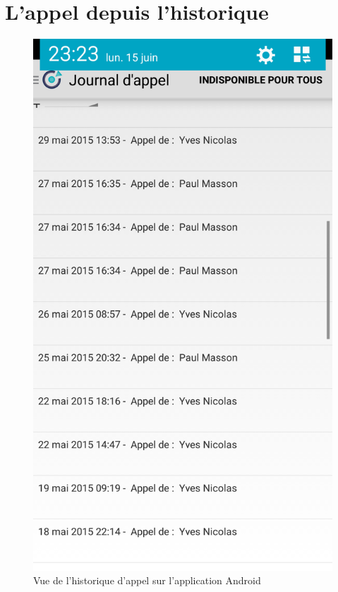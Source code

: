 \section{L'appel depuis l'historique}

\begin{figure}[!h]
	\centering
	\includegraphics[scale=0.1]{img/historique.png}
	\caption{\label{historique} {Vue de l'historique d'appel sur l'application Android}}
\end{figure}

